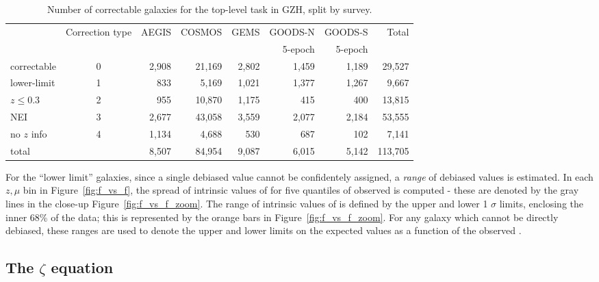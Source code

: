 \begin{table}
\rotate
\caption{Number of correctable galaxies for the top-level task in GZH, split by \hst{} survey.}\label{tab:hubble_debiasable}
\begin{tabular}{lcrrrrr|r}
\hline\hline
                    & Correction type & AEGIS   & COSMOS & GEMS  & GOODS-N & GOODS-S  &  Total  \\
                    &                 &         &        &       & 5-epoch & 5-epoch  &         \\
\hline
correctable         & 0               & 2,908   & 21,169 & 2,802 & 1,459   & 1,189    &  29,527 \\
lower-limit         & 1               &   833   &  5,169 & 1,021 & 1,377   & 1,267    &   9,667 \\
$z \le 0.3$         & 2               &   955   & 10,870 & 1,175 &   415   &   400    &  13,815 \\ 
NEI                 & 3               & 2,677   & 43,058 & 3,559 & 2,077   & 2,184    &  53,555 \\
no $z$ info         & 4               & 1,134   &  4,688 &   530 &   687   &   102    &   7,141 \\
\hline
total               &                 & 8,507   & 84,954 & 9,087 & 6,015   & 5,142    & 113,705 \\
\hline\hline
\end{tabular}
\end{table}


For the ``lower limit'' galaxies, since a single debiased \ffeatures{} value cannot be confidentely assigned, a \emph{range} of debiased values is estimated. In each $z,\mu$ bin in Figure~\ref{fig:f_vs_f}, the spread of intrinsic values of \ffeaturesrest{} for five quantiles of observed \ffeatures{} is computed - these are denoted by the gray lines in the close-up Figure~\ref{fig:f_vs_f_zoom}. The range of intrinsic values of \ffeatures{} is defined by the upper and lower 1 $\sigma$ limits, enclosing the inner 68\% of the data; this is represented by the orange bars in Figure~\ref{fig:f_vs_f_zoom}. For any galaxy which cannot be directly debiased, these ranges are used to denote the upper and lower limits on the expected values \ffeaturesrest{} as a function of the observed \ffeatures{}. 

\subsection{The $\zeta$ equation}

